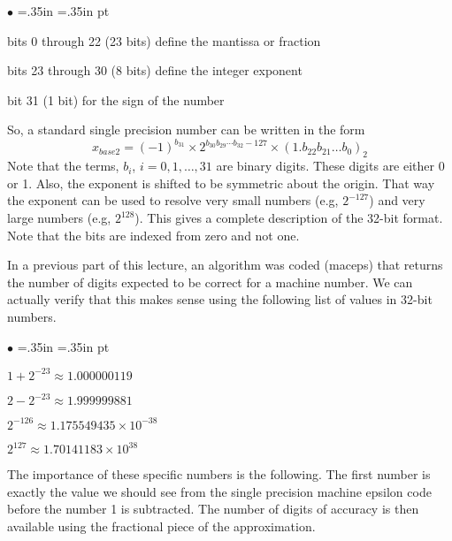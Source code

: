 \documentclass[10pt,fleqn]{article}
\begin{document}
\begin{list}{$\bullet$}{ \parsep=0pt \listparindent=0pt
\topsep=0pt \rightmargin=.35in \leftmargin=.35in  pt
\itemsep=2pt}
  \item bits 0 through 22 (23 bits) define the mantissa or fraction
  \item bits 23 through 30 (8 bits) define the integer exponent
  \item bit 31 (1 bit) for the sign of the number
\end{list}

So, a standard single precision number can be written in the form
\[
  x_{base 2} = (-1)^{b_{31}} \times 2^{b_{30}b_{29}\cdots b_{32}-127}
     \times (1.b_{22}b_{21}\ldots b_{0})_2
\]
Note that the terms, $b_i$, $i=0,1,\ldots,31$ are binary digits. These digits
are either 0 or 1. Also, the exponent is shifted to be symmetric about the
origin. That way the exponent can be used to resolve very small numbers
(e.g, $2^{-127}$) and very large numbers (e.g, $2^{128}$). This gives a complete
description of the 32-bit format. Note that the bits are indexed from zero and
not one. 

In a previous part of this lecture, an algorithm was coded (maceps) that returns
the number of digits expected to be correct for a machine number. We can
actually verify that this makes sense using the following list of values in
32-bit numbers.

\begin{list}{$\bullet$}{ \parsep=0pt \listparindent=0pt
\topsep=0pt \rightmargin=.35in \leftmargin=.35in  pt
\itemsep=2pt}
  \item $1 + 2^{-23} \approx 1.000000119$
  \item $2 - 2^{-23} \approx 1.999999881$
  \item $2^{-126} \approx 1.175549435 \times 10^{-38}$
  \item $2^{127} \approx 1.70141183 \times 10^{38}$
\end{list}

The importance of these specific numbers is the following. The first number is
exactly the value we should see from the single precision machine epsilon code
before the number 1 is subtracted. The number of digits of accuracy is then
available using the fractional piece of the approximation.
\end{document}

